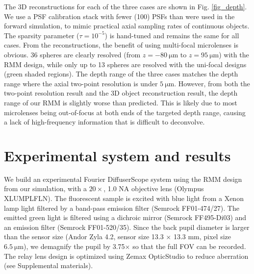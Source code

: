 \documentclass{osa-article}
\begin{document}
The 3D reconstructions for each of the three cases are shown in Fig. \ref{fig_depth}. We use a PSF calibration stack with fewer (100) PSFs than were used in the forward simulation, to mimic practical axial sampling rates of continuous objects. The sparsity parameter ($\tau =10^{-5}$) is hand-tuned and remains the same for all cases. From the reconstructions, the benefit of using multi-focal microlenses is obvious. 36 spheres are clearly resolved (from $z=\SI{-80}{\micro\meter}$ to $z=\SI{95}{\micro\meter}$) with the RMM design, while only up to 13 spheres are resolved with the uni-focal designs (green shaded regions). The depth range of the three cases matches the depth range where the axial two-point resolution is under $\SI{5}{\micro\meter}$. However, from both the two-point resolution result and the 3D object reconstruction result, the depth range of our RMM is slightly worse than predicted. This is likely due to most microlenses being out-of-focus at both ends of the targeted depth range, causing a lack of high-frequency information that is difficult to deconvolve. 


\section{Experimental system and results}
We build an experimental Fourier DiffuserScope system using the RMM design from our simulation, with a $20\times$, 1.0 NA objective lens (Olympus XLUMPLFLN). The fluorescent sample is excited with blue light from a Xenon lamp light filtered by a band-pass emission filter (Semrock FF01-474/27). The emitted green light is filtered using a dichroic mirror (Semrock FF495-Di03)  and an emission filter (Semrock FF01-520/35). Since the back pupil diameter is larger than the sensor size (Andor Zyla 4.2, sensor size 13.3 $\times$ 13.3 mm, pixel size $\SI{6.5}{\micro\meter}$), we demagnify the pupil by 3.75$\times$ so that the full FOV can be recorded. The relay lens design is optimized using Zemax OpticStudio to reduce aberration (see Supplemental materials). 

\label{section_experiment}
\end{document}

